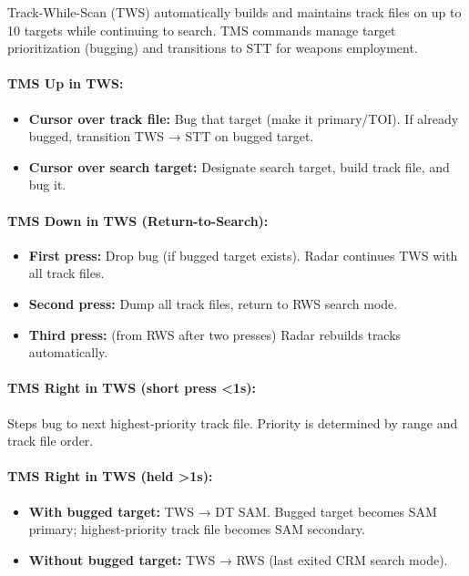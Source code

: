 \documentclass[11pt, a4paper, twoside]{report}
\begin{document}
Track-While-Scan (TWS) automatically builds and maintains track files on up to 10 targets while continuing to search. TMS commands manage target prioritization (bugging) and transitions to STT for weapons employment.

\paragraph{TMS Up in TWS:}
\begin{itemize}
    \item \textbf{Cursor over track file:} Bug that target (make it primary/TOI). If already bugged, transition TWS → STT on bugged target.
    \item \textbf{Cursor over search target:} Designate search target, build track file, and bug it.
\end{itemize}

\paragraph{TMS Down in TWS (Return-to-Search):}
\begin{itemize}
    \item \textbf{First press:} Drop bug (if bugged target exists). Radar continues TWS with all track files.
    \item \textbf{Second press:} Dump all track files, return to RWS search mode.
    \item \textbf{Third press:} (from RWS after two presses) Radar rebuilds tracks automatically.
\end{itemize}

\paragraph{TMS Right in TWS (short press <1s):}
Steps bug to next highest-priority track file. Priority is determined by range and track file order.

\paragraph{TMS Right in TWS (held >1s):}
\begin{itemize}
    \item \textbf{With bugged target:} TWS → DT SAM. Bugged target becomes SAM primary; highest-priority track file becomes SAM secondary.
    \item \textbf{Without bugged target:} TWS → RWS (last exited CRM search mode).
\end{itemize}
\end{document}
